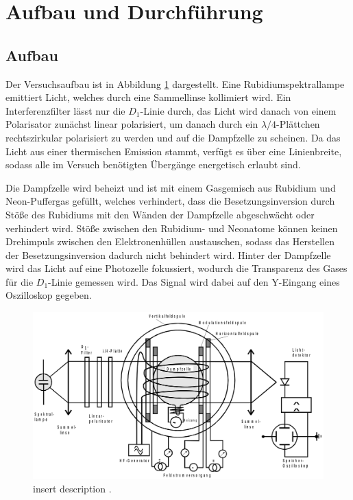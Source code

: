 \section{Aufbau und Durchführung}
\label{sec:Durchführung}

  \subsection{Aufbau}

  Der Versuchsaufbau ist in Abbildung \ref{fig:aufbau} dargestellt.
  Eine Rubidiumspektrallampe emittiert Licht, welches durch eine Sammellinse kollimiert wird.
  Ein Interferenzfilter lässt nur die $D_1$-Linie durch, das Licht wird danach von einem Polarisator zunächst linear polarisiert, um danach durch ein $\lambda/4$-Plättchen rechtszirkular polarisiert zu werden und auf die Dampfzelle zu scheinen. Da das Licht aus einer thermischen Emission stammt, verfügt es über eine Linienbreite, sodass alle im Versuch benötigten Übergänge energetisch erlaubt sind.

  Die Dampfzelle wird beheizt und ist mit einem Gasgemisch aus Rubidium und Neon-Puffergas gefüllt, welches verhindert, dass die Besetzungsinversion durch Stöße des Rubidiums mit den Wänden der Dampfzelle abgeschwächt oder verhindert wird. Stöße zwischen den Rubidium- und Neonatome können keinen Drehimpuls zwischen den Elektronenhüllen austauschen, sodass das Herstellen der Besetzungsinversion dadurch nicht behindert wird. Hinter der Dampfzelle wird das Licht auf eine Photozelle fokussiert, wodurch die Transparenz des Gases für die $D_1$-Linie gemessen wird. Das Signal wird dabei auf den Y-Eingang eines Oszilloskop gegeben.

  \begin{figure}
    \centering
    \includegraphics[width=\textwidth]{pictures/aufbau.png}
    \caption{insert description \cite{Versuchsanleitung}.}
    \label{fig:aufbau}
  \end{figure}

